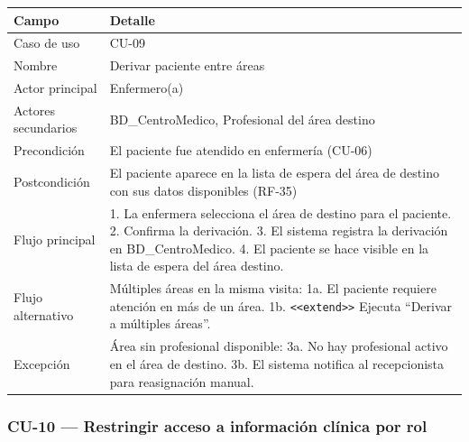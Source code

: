 \documentclass[11pt,a4paper]{article}
\begin{document}
	\begin{longtable}{p{} p{} }
		
		
		\toprule
		\textbf{Campo} &
		\textbf{Detalle}  \\
		\midrule
		\endhead
		
		Caso de uso & CU-09 \\
		Nombre & Derivar paciente entre áreas \\
		Actor principal & Enfermero(a) \\
		Actores secundarios & BD\_CentroMedico, Profesional del área destino \\
		Precondición & El paciente fue atendido en enfermería (CU-06) \\
		Postcondición & El paciente aparece en la lista de espera del área de destino con sus datos disponibles (RF-35) \\
		Flujo principal & 1. La enfermera selecciona el área de destino para el paciente. 2. Confirma la derivación. 3. El sistema registra la derivación en BD\_CentroMedico. 4. El paciente se hace visible en la lista de espera del área destino. \\
		Flujo alternativo & Múltiples áreas en la misma visita: 1a. El paciente requiere atención en más de un área. 1b. \texttt{<<extend>>} Ejecuta ``Derivar a múltiples áreas''. \\
		Excepción & Área sin profesional disponible: 3a. No hay profesional activo en el área de destino. 3b. El sistema notifica al recepcionista para reasignación manual. \\
		\bottomrule
	\end{longtable}
	
	\subsubsection{CU-10 --- Restringir acceso a información clínica por rol}
	
\end{document}
